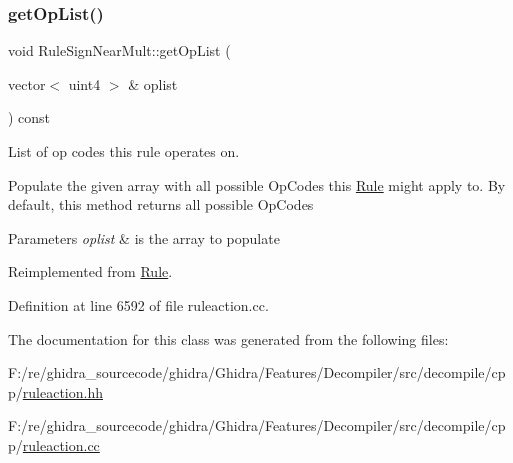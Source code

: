 \subsubsection{\texorpdfstring{getOpList()}{getOpList()}}
{\footnotesize\ttfamily void Rule\+Sign\+Near\+Mult\+::get\+Op\+List (\begin{DoxyParamCaption}\item[{vector$<$ uint4 $>$ \&}]{oplist }\end{DoxyParamCaption}) const\hspace{0.3cm}{\ttfamily [virtual]}}



List of op codes this rule operates on. 

Populate the given array with all possible Op\+Codes this \mbox{\hyperlink{class_rule}{Rule}} might apply to. By default, this method returns all possible Op\+Codes 
\begin{DoxyParams}{Parameters}
{\em oplist} & is the array to populate \\
\hline
\end{DoxyParams}


Reimplemented from \mbox{\hyperlink{class_rule_a4023bfc7825de0ab866790551856d10e}{Rule}}.



Definition at line 6592 of file ruleaction.\+cc.



The documentation for this class was generated from the following files\+:\begin{DoxyCompactItemize}
\item 
F\+:/re/ghidra\+\_\+sourcecode/ghidra/\+Ghidra/\+Features/\+Decompiler/src/decompile/cpp/\mbox{\hyperlink{ruleaction_8hh}{ruleaction.\+hh}}\item 
F\+:/re/ghidra\+\_\+sourcecode/ghidra/\+Ghidra/\+Features/\+Decompiler/src/decompile/cpp/\mbox{\hyperlink{ruleaction_8cc}{ruleaction.\+cc}}\end{DoxyCompactItemize}
